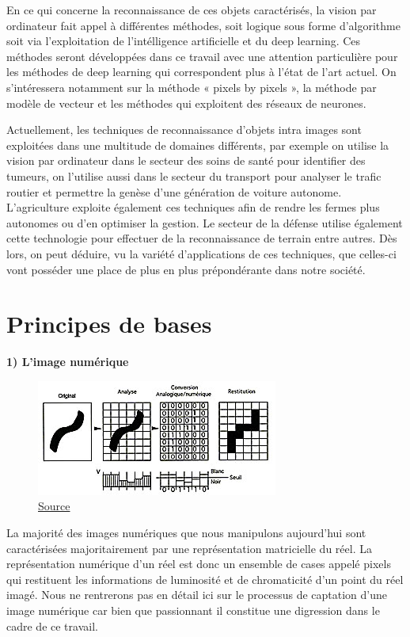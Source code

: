 \documentclass[a4paper,12pt]{article} %
\begin{document}
	En ce qui concerne la reconnaissance de ces objets caractérisés, la vision par ordinateur fait appel à différentes méthodes, soit logique sous forme d'algorithme soit via l'exploitation de l'intélligence artificielle et du deep learning. Ces méthodes seront développées dans ce travail avec une attention particulière pour les méthodes de deep learning qui correspondent plus à l'état de l'art actuel. On s’intéressera notamment sur la méthode « pixels by pixels », la méthode par modèle de vecteur et les méthodes qui exploitent des réseaux de neurones.\newline

	Actuellement, les techniques de reconnaissance d’objets intra images sont exploitées dans une multitude de domaines différents, par exemple on utilise la vision par ordinateur dans le secteur des soins de santé pour identifier des tumeurs, on l’utilise aussi dans le secteur du transport pour analyser le trafic routier et permettre la genèse d’une génération de voiture autonome. L’agriculture exploite également ces techniques afin de rendre les fermes plus autonomes ou d'en optimiser la gestion. Le secteur de la défense utilise également cette technologie pour effectuer de la reconnaissance de terrain entre autres. Dès lors, on peut déduire, vu la variété d’applications de ces techniques, que celles-ci vont posséder une place de plus en plus prépondérante dans notre société.\newline
\newpage
\section{Principes de bases}
\textbf{1) L'image numérique }\newline
\begin{figure}[h] %
  \centering %
  \includegraphics[scale=0.8]{binaire.jpg} %
  \caption{\href{http://www.map.toulouse.archi.fr/works/panoformation
  /imagenum/imagenum.html}{Source} } %
\end{figure}
\newline
\par
	La majorité des images numériques que nous manipulons aujourd’hui sont caractérisées majoritairement par une représentation matricielle du réel. La représentation numérique d’un réel est donc un ensemble de cases appelé pixels qui restituent les informations de luminosité et de chromaticité d’un point du réel imagé. Nous ne rentrerons pas en détail ici sur le processus de captation d’une image numérique car bien que passionnant il constitue une digression dans le cadre de ce travail. \newline
\end{document}
